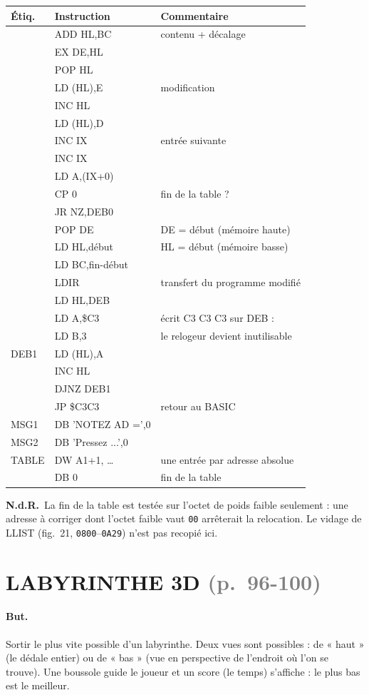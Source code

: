 \documentclass[a4paper,10pt]{article}
\makeatletter
\newcommand{\hex}[1]{\texttt{#1}}
\newcommand{\pg}[1]{\texorpdfstring{\textcolor{gray}{\small(p.~#1)}}{}}
\newcommand{\nota}[1]{\textcolor{red!60!black}{\small\textbf{N.d.R.}~#1}}
\newenvironment{src}
  {\small\begin{longtable}{@{}>{\ttfamily}l>{\ttfamily}l>{\raggedright\arraybackslash}p{8.6cm}@{}}
   \toprule
   \normalfont\bfseries Étiq. & \normalfont\bfseries Instruction & \textbf{Commentaire}\\
   \midrule\endhead
   \bottomrule\endfoot}
  {\end{longtable}}
\makeatother
\begin{document}
\begin{src}
 & ADD HL,BC & contenu + décalage \\
 & EX DE,HL & \\
 & POP HL & \\
 & LD (HL),E & modification \\
 & INC HL & \\
 & LD (HL),D & \\
 & INC IX & entrée suivante \\
 & INC IX & \\
 & LD A,(IX+0) & \\
 & CP 0 & fin de la table ? \\
 & JR NZ,DEB0 & \\
 & POP DE & DE = début (mémoire haute) \\
 & LD HL,début & HL = début (mémoire basse) \\
 & LD BC,fin-début & \\
 & LDIR & transfert du programme modifié \\
 & LD HL,DEB & \\
 & LD A,\$C3 & écrit C3 C3 C3 sur DEB : \\
 & LD B,3 & le relogeur devient inutilisable \\
DEB1 & LD (HL),A & \\
 & INC HL & \\
 & DJNZ DEB1 & \\
 & JP \$C3C3 & retour au BASIC \\
MSG1 & DB 'NOTEZ AD =',0 & \\
MSG2 & DB 'Pressez ...',0 & \\
TABLE & DW A1+1, \dots & une entrée par adresse absolue \\
 & DB 0 & fin de la table \\
\end{src}
\nota{La fin de la table est testée sur l'octet de poids faible seulement :
une adresse à corriger dont l'octet faible vaut \hex{00} arrêterait la
relocation. Le vidage de LLIST (fig.~21, \hex{0800}--\hex{0A29}) n'est pas
recopié ici.}

\section{LABYRINTHE 3D \pg{96-100}}

\paragraph{But.} Sortir le plus vite possible d'un labyrinthe. Deux vues
sont possibles : de « haut » (le dédale entier) ou de « bas » (vue en
perspective de l'endroit où l'on se trouve). Une boussole guide le joueur et
un score (le temps) s'affiche : le plus bas est le meilleur.
\end{document}
